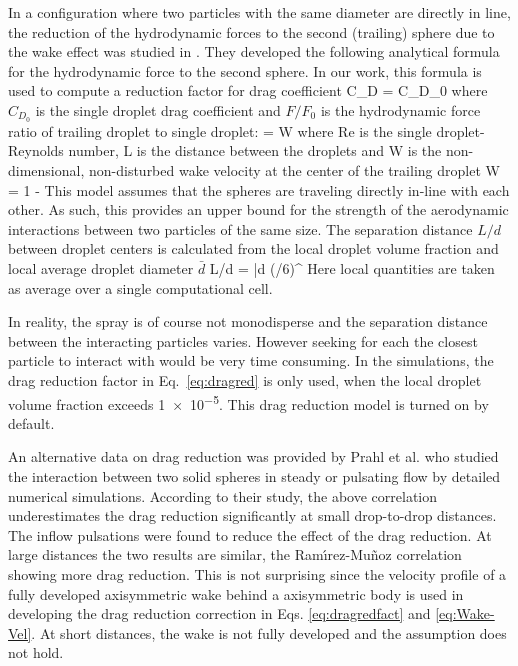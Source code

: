 In a configuration where two particles with the same diameter are directly in line, the reduction of the hydrodynamic forces to the second (trailing) sphere due to the wake effect was studied in \cite{Ramirez:1}. They developed the following analytical formula for the hydrodynamic force to the second sphere. In our work, this formula is used to compute a reduction factor for drag coefficient
\be
  C_D = C_{D_0}  \label{eq:dragred}
\ee
where $C_{D_0}$ is the single droplet drag coefficient and $F / F_0$ is the hydrodynamic force ratio of trailing droplet to single droplet:
\be
   = W  \label{eq:dragredfact}
\ee
where Re is the single droplet-Reynolds number, L is the distance between the droplets and W is the non-dimensional, non-disturbed wake velocity at the center of the trailing droplet
\be
  W = 1 -   \label{eq:Wake-Vel}
\ee
This model assumes that the spheres are traveling directly in-line with each other. As such, this provides an upper bound for the strength of the aerodynamic interactions between two particles of the same size. The separation distance $L/d$ between droplet centers is calculated from the local droplet volume fraction and local average droplet diameter $\bar{d}$
\be
  L/d = \bar{d} \left(\pi/6\alpha \right)^{}
\ee
Here local quantities are taken as average over a single computational cell. 

In reality, the spray is of course not monodisperse and the separation distance between the interacting particles varies. However seeking for each the closest particle to interact with would be very time consuming. In the simulations, the drag reduction factor in Eq.~\ref{eq:dragred} is only used, when the local droplet volume fraction exceeds \num{1e-5}. This drag reduction model is turned on by default.

An alternative data on drag reduction was provided by Prahl et al. \cite{Prahl:1} who studied the interaction between two solid spheres in steady or pulsating flow by detailed numerical simulations. According to their study, the above correlation underestimates the drag reduction significantly at small drop-to-drop distances. The inflow pulsations were found to reduce the effect of the drag reduction. At large distances the two results are similar, the Ram\'{\i}rez-Mu\~{n}oz correlation showing more drag reduction. This is not surprising since the velocity profile of a fully developed axisymmetric wake behind a axisymmetric body is used in developing the drag reduction correction in Eqs. \ref{eq:dragredfact} and \ref{eq:Wake-Vel}. At short distances, the wake is not fully developed and the assumption does not hold. 

